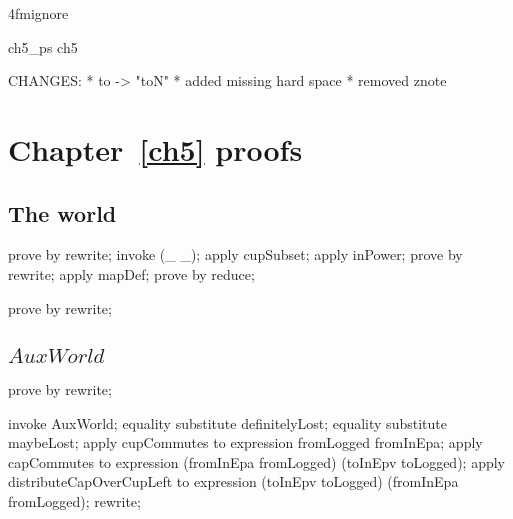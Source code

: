 \ai4fmignore{
\begin{zsection}
  \SECTION ch5\_ps \parents ch5
\end{zsection}
CHANGES:
* to -> "toN"
* added missing hard space
* removed znote
}

\chapter{Chapter~\ref{ch5} proofs}

\section{The world}

\begin{LPScript}\begin{zproof}[tLogbookConsistency]
    prove by rewrite;
    invoke (\_ \rel \_);
    apply cupSubset;
    apply inPower;
    prove by rewrite;
    apply mapDef;
    prove by reduce;
\end{zproof}\end{LPScript}

\begin{LDCheck}\begin{zproof}
   prove by rewrite;
\end{zproof}\end{LDCheck}

\section{$AuxWorld$}

\begin{LDCheck}\begin{zproof}
   prove by rewrite;
\end{zproof}\end{LDCheck}

\begin{LPScript}\begin{zproof}[tAuxWorldIdentity]
  invoke AuxWorld;
  equality substitute definitelyLost;
  equality substitute maybeLost;
  apply cupCommutes to expression fromLogged \cup fromInEpa;
  apply capCommutes to expression
            (fromInEpa \cup fromLogged) \cap (toInEpv \cup toLogged);
  apply distributeCapOverCupLeft to expression
            (toInEpv \cup toLogged) \cap (fromInEpa \cup fromLogged);
  rewrite;
\end{zproof}\end{LPScript}

